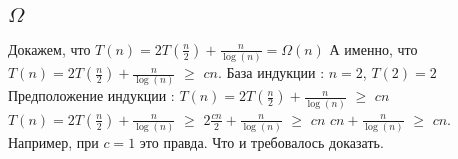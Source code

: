 \documentclass{article}
\begin{document}
\subsection{$\Omega$}
Докажем, что $T(n) = 2T(\frac{n}{2}) + \frac{n}{\log(n)} = \Omega(n)$
\newline
А именно, что $T(n) = 2T(\frac{n}{2}) + \frac{n}{\log(n)}$ $\geq$ $cn$.
\newline
База индукции : $n = 2$, $T(2) = 2$ 
\newline
Предположение индукции : $T(n) = 2T(\frac{n}{2}) + \frac{n}{\log(n)}$ $\geq$ $cn$
\newline%
$T(n) = 2T(\frac{n}{2}) + \frac{n}{\log(n)}$ $\geq$ $2\frac{cn}{2} + \frac{n}{\log(n)}$ $\geq$ $cn$
\newline
$cn + \frac{n}{\log(n)}$ $\geq$ $cn$. Например, при $c = 1$ это правда.
\newline
Что и требовалось доказать.
\end{document}
